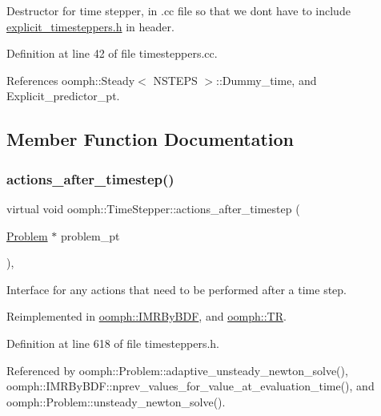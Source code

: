 Destructor for time stepper, in .cc file so that we don\textquotesingle{}t have to include \hyperlink{explicit__timesteppers_8h}{explicit\+\_\+timesteppers.\+h} in header. 

Definition at line 42 of file timesteppers.\+cc.



References oomph\+::\+Steady$<$ N\+S\+T\+E\+P\+S $>$\+::\+Dummy\+\_\+time, and Explicit\+\_\+predictor\+\_\+pt.



\subsection{Member Function Documentation}
\mbox{\label{classoomph_1_1TimeStepper_a3a0fabf83f9bdc89800cd3501df2c586}} 
\subsubsection{\texorpdfstring{actions\+\_\+after\+\_\+timestep()}{actions\_after\_timestep()}}
{\footnotesize\ttfamily virtual void oomph\+::\+Time\+Stepper\+::actions\+\_\+after\+\_\+timestep (\begin{DoxyParamCaption}\item[{\hyperlink{classoomph_1_1Problem}{Problem} $\ast$}]{problem\+\_\+pt }\end{DoxyParamCaption})\hspace{0.3cm}{\ttfamily [inline]}, {\ttfamily [virtual]}}

Interface for any actions that need to be performed after a time step. 

Reimplemented in \hyperlink{classoomph_1_1IMRByBDF_a1eb1b47643bf37e27c478c6987c7716d}{oomph\+::\+I\+M\+R\+By\+B\+DF}, and \hyperlink{classoomph_1_1TR_ae6a606637401e9ed5ca030fa7b28d89a}{oomph\+::\+TR}.



Definition at line 618 of file timesteppers.\+h.



Referenced by oomph\+::\+Problem\+::adaptive\+\_\+unsteady\+\_\+newton\+\_\+solve(), oomph\+::\+I\+M\+R\+By\+B\+D\+F\+::nprev\+\_\+values\+\_\+for\+\_\+value\+\_\+at\+\_\+evaluation\+\_\+time(), and oomph\+::\+Problem\+::unsteady\+\_\+newton\+\_\+solve().

